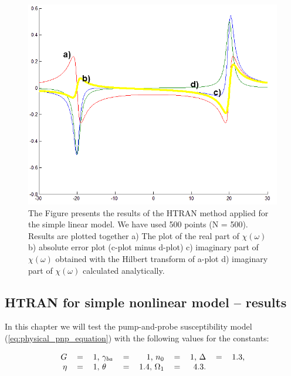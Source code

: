 \documentclass[12pt,twoside,a4paper]{article}
\numberwithin{equation}{subsection}
\numberwithin{figure}{subsection}
\begin{document}
\begin{figure} 
  \includegraphics[width=150mm]{img/htran_lin.png}
  \caption{The Figure presents the results of the HTRAN method applied for the simple linear model. We have used 500 points (N = 500). Results are plotted together 
   a) The plot of the real part of $\chi (\omega )$ 
   b) absolute error plot (c-plot minus d-plot) 
   c) imaginary part of $\chi (\omega )$ obtained with the Hilbert transform of a-plot 
   d) imaginary part of $\chi (\omega )$ calculated analytically. \label{eq:htran_lin}
  }
\end{figure}

\subsection{HTRAN for simple nonlinear model -- results} \label{chap:htran_nlo}

In this chapter we will test the pump-and-probe susceptibility model (\ref{eq:physical_pnp_equation}) with the following values for the constants:

\begin{equation} \label{eq:htran_pnpparameters}
  \begin{tabular}{r r l r r l r r l r r l}
    $G$           & $=$ & $1$, 
    $\gamma_{ba}$ & $=$ & $1$, 
    $n_0$         & $=$ & $1$, 
    $\Delta$      & $=$ & $1.3$, \\
    $\eta$        & $=$ & $1$, 
    $\theta$      & $=$ & $1.4$, 
    $\Omega_{1}$  & $=$ & $4.3$. \\
  \end{tabular}
\end{equation}
\end{document}
